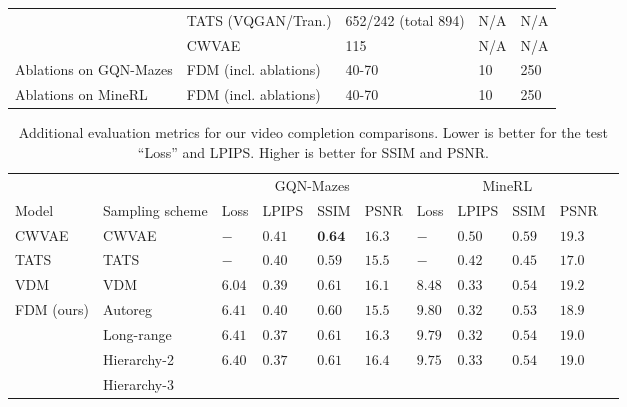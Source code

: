 \begin{table}[t]
\begin{tabular}{p{1.1cm}lllp{0.7cm}}
                                       &  TATS (VQGAN/Tran.)       & 652/242 (total 894)     & N/A  & N/A      \\
                                       &  CWVAE                     & 115   & N/A   & N/A      \\
   \midrule
    Ablations on GQN-Mazes   &  FDM (incl. ablations)     & 40-70  & 10    & 250      \\
   \midrule
    Ablations on MineRL  &  FDM (incl. ablations)     & 40-70  & 10    & 250      \\
    \bottomrule
  \end{tabular}
\end{table}

\begin{table}[t]
  \tiny
  \caption{Additional evaluation metrics for our video completion comparisons. Lower is better for the test ``Loss'' and LPIPS. Higher is better for SSIM and PSNR.}
  \label{tab:fdm-extra-metrics}
  \centering
  \begin{tabular}{lllllllllll}
    \toprule
    \multicolumn{1}{r}{} & & \multicolumn{4}{c}{GQN-Mazes}  & \multicolumn{4}{c}{MineRL} \\
    \cmidrule(r){3-6} \cmidrule(r){7-10}
    Model &  Sampling scheme    & Loss  & LPIPS  & SSIM   & PSNR  & Loss  & LPIPS   & SSIM   &  PSNR \\
    \midrule
    \multirow{1}{*}{CWVAE~\citep{saxena2021clockwork}}& CWVAE
    & $-   $ & $0.41$  & $\textbf{0.64}$  & $16.3$  & $-   $  & $0.50$  & $\mathbf{0.59}$  & $\mathbf{19.3}$ \\
    \midrule
    \multirow{1}{*}{TATS~\citep{ge2022long}}& TATS
    & $-$ & $0.40$  & $0.59$  & $15.5$  & $-$  & $0.42$  & $0.45$  & $17.0$  \\
    \midrule
    \multirow{1}{*}{VDM~\citep{ho2022video}}& VDM
    & $\mathbf{6.04}$ & $0.39$  & $0.61$  & $16.1$  & $\mathbf{8.48}$  & $0.33$  & $0.54$  & $19.2$  \\
    \midrule
\multirow{5}{*}{FDM (ours)}   &  Autoreg
    & $6.41$ & $0.40$  & $0.60$  & $15.5$  & $9.80$  & $\mathbf{0.32}$  & $0.53$  & $18.9$  \\
                            &  Long-range
    & $6.41$ & $\mathbf{0.37}$  & $0.61$  & $16.3$  & $9.79$  & $\mathbf{0.32}$  & $0.54$  & $19.0$        \\
                            &  Hierarchy-2
    & $6.40$ & $\mathbf{0.37}$  & $0.61$  & $\mathbf{16.4}$  & $9.75$  & $0.33$  & $0.54$  & $19.0$ \\
                            &  Hierarchy-3

\end{tabular}
\end{table}
